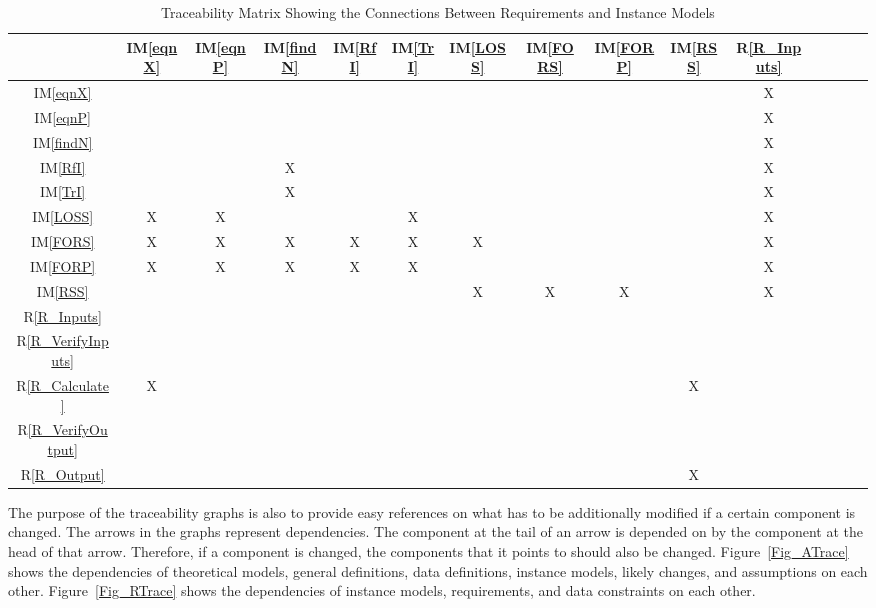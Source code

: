 \documentclass[12pt]{article}
\newcommand{\iref}[1]{IM\ref{#1}}
\newcommand{\rref}[1]{R\ref{#1}}
\begin{document}
\begin{table}[h!]
\centering
\begin{tabular}{|c|c|c|c|c|c|c|c|c|c|c|c|c|c|c|}
\hline
	& \iref{eqnX}& \iref{eqnP}& \iref{findN}& \iref{RfI}& \iref{TrI}& \iref{LOSS}& \iref{FORS}& \iref{FORP}& \iref{RSS}& \rref{R_Inputs}\\
\hline
\iref{eqnX}            	& & & & & & & & & &X\\ \hline
\iref{eqnP}            	& & & & & & & & & &X\\ \hline
\iref{findN}          	& & & & & & & & & &X\\ \hline
\iref{RfI}          	& & &X& & & & & & &X\\ \hline
\iref{TrI}     			& & &X& & & & & & &X\\ \hline
\iref{LOSS}    			&X&X& & &X& & & & &X\\ \hline
\iref{FORS}   			&X&X&X&X&X&X& & & &X\\ \hline
\iref{FORP}  			&X&X&X&X&X& & & & &X\\ \hline
\iref{RSS}     			& & & & & &X&X&X& &X\\ \hline 
\rref{R_Inputs}       	& & & & & & & & & &\\ \hline
\rref{R_VerifyInputs}   & & & & & & & & & &\\ \hline
\rref{R_Calculate}     	&X& & & & & & & &X&\\ \hline
\rref{R_VerifyOutput}  	& & & & & & & & & &\\ \hline
\rref{R_Output} 		& & & & & & & & &X&\\
\hline
\end{tabular}
\caption{Traceability Matrix Showing the Connections Between Requirements and Instance Models}
\label{Table:R_trace}
\end{table}

The purpose of the traceability graphs is also to provide easy references on
what has to be additionally modified if a certain component is changed.  The
arrows in the graphs represent dependencies. The component at the tail of an
arrow is depended on by the component at the head of that arrow. Therefore, if a
component is changed, the components that it points to should also be
changed. Figure~\ref{Fig_ATrace} shows the dependencies of theoretical models,
general definitions, data definitions, instance models, likely changes, and
assumptions on each other. Figure~\ref{Fig_RTrace} shows the dependencies of
instance models, requirements, and data constraints on each other.
\end{document}
